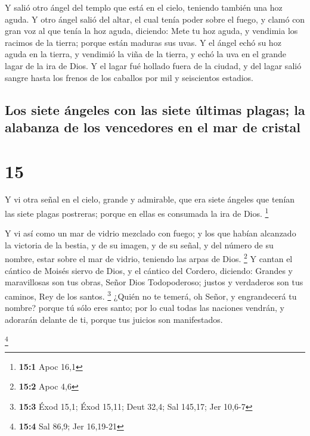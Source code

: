  Y salió otro ángel del templo que está en el cielo,
teniendo también una hoz aguda.  Y otro ángel salió del
altar, el cual tenía poder sobre el fuego, y clamó con gran voz al que
tenía la hoz aguda, diciendo: Mete tu hoz aguda, y vendimia los racimos
de la tierra; porque están maduras sus uvas.  Y el ángel
echó su hoz aguda en la tierra, y vendimió la viña de la tierra, y echó
la uva en el grande lagar de la ira de Dios.  Y el lagar
fué hollado fuera de la ciudad, y del lagar salió sangre hasta los
frenos de los caballos por mil y seiscientos estadios.

\hypertarget{los-siete-uxe1ngeles-con-las-siete-uxfaltimas-plagas-la-alabanza-de-los-vencedores-en-el-mar-de-cristal}{%
\subsection{Los siete ángeles con las siete últimas plagas; la alabanza
de los vencedores en el mar de
cristal}\label{los-siete-uxe1ngeles-con-las-siete-uxfaltimas-plagas-la-alabanza-de-los-vencedores-en-el-mar-de-cristal}}

\hypertarget{section-14}{%
\section{15}\label{section-14}}

 Y vi otra señal en el cielo, grande y admirable, que era
siete ángeles que tenían las siete plagas postreras; porque en ellas es
consumada la ira de Dios. \footnote{\textbf{15:1} Apoc 16,1}

 Y vi así como un mar de vidrio mezclado con fuego; y los
que habían alcanzado la victoria de la bestia, y de su imagen, y de su
señal, y del número de su nombre, estar sobre el mar de vidrio, teniendo
las arpas de Dios. \footnote{\textbf{15:2} Apoc 4,6}  Y
cantan el cántico de Moisés siervo de Dios, y el cántico del Cordero,
diciendo: Grandes y maravillosas son tus obras, Señor Dios Todopoderoso;
justos y verdaderos son tus caminos, Rey de los santos. \footnote{\textbf{15:3}
  Éxod 15,1; Éxod 15,11; Deut 32,4; Sal 145,17; Jer 10,6-7}
 ¿Quién no te temerá, oh Señor, y engrandecerá tu nombre?
porque tú sólo eres santo; por lo cual todas las naciones vendrán, y
adorarán delante de ti, porque tus juicios son manifestados.

\footnote{\textbf{15:4} Sal 86,9; Jer 16,19-21}


